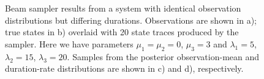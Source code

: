 
\begin{figure}
     \\
     \\
    \caption{Beam sampler results from a system with identical observation distributions but differing durations. Observations are shown in a); true states in b) overlaid with 20 state traces produced by the sampler. Here we have parameters $\mu_1 = \mu_2 = 0$, $\mu_3 = 3$ and $\lambda_1 = 5$, $\lambda_2 = 15$, $\lambda_3 = 20$. Samples from the posterior observation-mean and duration-rate distributions are shown in c) and d), respectively.}
    \label{fig:experiment2_results}
\end{figure}
